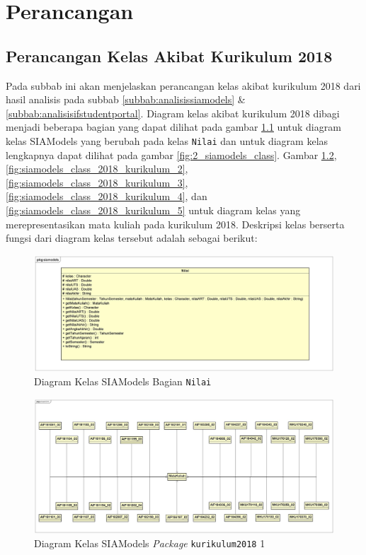 \chapter{Perancangan}
\label{chap:perancangan}

\section{Perancangan Kelas Akibat Kurikulum 2018}

Pada subbab ini akan menjelaskan perancangan kelas akibat kurikulum 2018 dari hasil analisis pada subbab \ref{subbab:analisissiamodels} \& \ref{subbab:analisisifstudentportal}. Diagram kelas akibat kurikulum 2018 dibagi menjadi beberapa bagian yang dapat dilihat pada gambar \ref{fig:siamodels_class_2018} untuk diagram kelas SIAModels yang berubah pada kelas \texttt{Nilai} dan untuk diagram kelas lengkapnya dapat dilihat pada gambar \ref{fig:2_siamodels_class}. Gambar \ref{fig:siamodels_class_2018_kurikulum_1}, \ref{fig:siamodels_class_2018_kurikulum_2}, \ref{fig:siamodels_class_2018_kurikulum_3}, \ref{fig:siamodels_class_2018_kurikulum_4}, dan \ref{fig:siamodels_class_2018_kurikulum_5} untuk diagram kelas yang merepresentasikan mata kuliah pada kurikulum 2018. Deskripsi kelas berserta fungsi dari diagram kelas tersebut adalah sebagai berikut:

\begin{figure}[H]
\centering
\includegraphics[scale=0.15]{Gambar/class-diagram-siamodels-new}
\caption{Diagram Kelas SIAModels Bagian \texttt{Nilai}}
\label{fig:siamodels_class_2018}
\end{figure}

\begin{figure}[H]
\centering
\includegraphics[scale=0.4]{Gambar/class-diagram-siamodels-mk-kurikulum-2018-2}
\caption{Diagram Kelas SIAModels \textit{Package} \texttt{kurikulum2018} 1}
\label{fig:siamodels_class_2018_kurikulum_1}
\end{figure}

